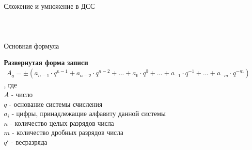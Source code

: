 \documentclass[hyperref=unicode, aspectratio=169]{beamer}
\begin{document}
\begin{frame}{Сложение и умножение в ДСС}
\begin{example}
\begin{columns}
\begin{column}{0.5\textwidth}
\begin{gather*}
                \end{gather*}
            \end{column}
        \end{columns}
    \end{example}
\end{frame}

\begin{frame}{Основная формула}
    \begin{definition}
        \textbf{Развернутая форма записи}
        \begin{gather*}
            A_q = \pm \left( a_{n-1} \cdot q^{n-1} + a_{n-2} \cdot q^{n-2} + \ldots + a_{0} \cdot q^{0} + \ldots + a_{-1} \cdot q^{-1} + \ldots + a_{-m} \cdot q^{-m} \right)
        \end{gather*}
        , где \\
        $A$ - число \\
        $q$ - основание системы счисления \\
        $a_i$ - цифры, принадлежащие алфавиту данной системы \\
        $n$ - количество целых разрядов числа \\
        $m$ - количество дробных разрядов числа \\
        $q^i$ - \glqq вес\grqq разряда\\
    \end{definition}
\end{frame}
\end{document}
